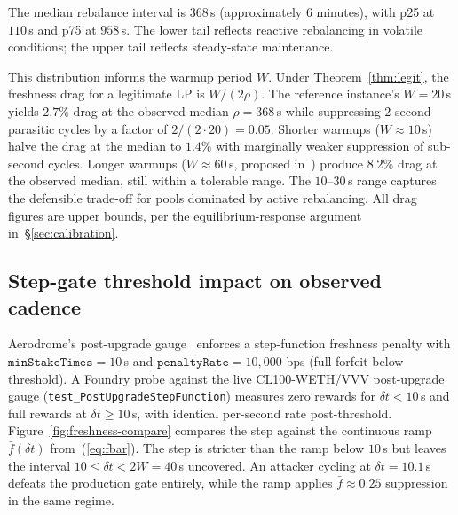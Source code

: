 \documentclass[11pt,a4paper]{article}
\theoremstyle{cgdefinition}
\theoremstyle{cgplain}
\theoremstyle{cgremark}
\begin{document}
The median rebalance interval is $368$\,s (approximately $6$ minutes), with p25 at $110$\,s and p75 at $958$\,s. The lower tail reflects reactive rebalancing in volatile conditions; the upper tail reflects steady-state maintenance.

This distribution informs the warmup period $W$. Under Theorem~\ref{thm:legit}, the freshness drag for a legitimate LP is $W/(2\rho)$. The reference instance's $W = 20$\,s yields $2.7\%$ drag at the observed median $\rho = 368$\,s while suppressing $2$-second parasitic cycles by a factor of $2/(2 \cdot 20) = 0.05$. Shorter warmups ($W \approx 10$\,s) halve the drag at the median to $1.4\%$ with marginally weaker suppression of sub-second cycles. Longer warmups ($W \approx 60$\,s, proposed in~\cite[\S5.2]{ryan2026c}) produce $8.2\%$ drag at the observed median, still within a tolerable range. The $10$--$30$\,s range captures the defensible trade-off for pools dominated by active rebalancing. All drag figures are upper bounds, per the equilibrium-response argument in~\S\ref{sec:calibration}.

\subsection{Step-gate threshold impact on observed cadence}\label{sec:threshold}

Aerodrome's post-upgrade gauge~\cite{aerodrome2026} enforces a step-function freshness penalty with $\texttt{minStakeTimes}=10$\,s and $\texttt{penaltyRate}=10{,}000$ bps (full forfeit below threshold). A Foundry probe against the live CL100-WETH/VVV post-upgrade gauge (\texttt{test\_Post\-Upgrade\-Step\-Function}) measures zero rewards for $\delta t < 10$\,s and full rewards at $\delta t \geq 10$\,s, with identical per-second rate post-threshold. Figure~\ref{fig:freshness-compare} compares the step against the continuous ramp $\bar f(\delta t)$ from~(\ref{eq:fbar}). The step is stricter than the ramp below $10$\,s but leaves the interval $10 \leq \delta t < 2W = 40$\,s uncovered. An attacker cycling at $\delta t = 10.1$\,s defeats the production gate entirely, while the ramp applies $\bar f \approx 0.25$ suppression in the same regime.
\end{document}
